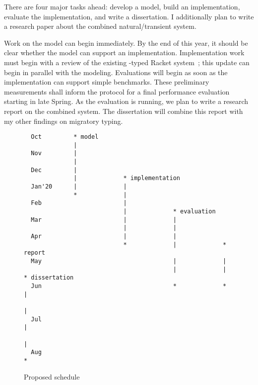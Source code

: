 There are four major tasks ahead:
  develop a model,
  build an implementation,
  evaluate the implementation,
  and write a dissertation.
I additionally plan to write a research paper about the combined
 natural/transient system.

Work on the model can begin immediately.
By the end of this year, it should be clear whether the model can support
 an implementation.
Implementation work must begin with a review of the existing
 \tshallow{}-typed Racket system~\cite{gf-icfp-2018};
 this update can begin in parallel with the modeling.
Evaluations will begin as soon as the implementation can support simple
 benchmarks.
These preliminary measurements shall inform the protocol for a final
 performance evaluation starting in late Spring.
As the evaluation is running, we plan to write a research report on the
 combined system.
The dissertation will combine this report with my other findings on
 migratory typing.

\begin{figure}[t]
\begin{verbatim}
  Oct         * model
              |
  Nov         |
              |
  Dec         |
              |             * implementation
  Jan'20      |             |
              *             |
  Feb                       |
                            |             * evaluation
  Mar                       |             |
                            |             |
  Apr                       |             |
                            *             |             * report
  May                                     |             |
                                          |             |             * dissertation
  Jun                                     *             *             |
                                                                      |
  Jul                                                                 |
                                                                      |
  Aug                                                                 *

\end{verbatim}
  \caption{Proposed schedule}
  \label{fig:schedule}
\end{figure}

